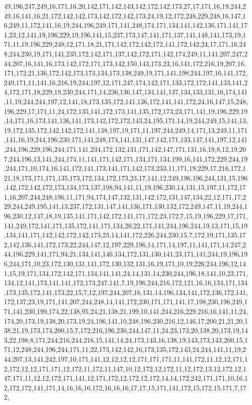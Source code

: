 49,196,247,249,16,171,16,20,142,171,142,143,142,172,142,173,27,17,171,16,19,244,249,16,141,16,21,172,142,142,173,142,172,142,173,24,19,12,172,248,229,248,16,147,16,249,11,172,141,16,19,244,196,249,171,141,248,174,171,134,141,142,136,171,141,171,23,12,141,19,196,229,19,196,141,15,237,173,147,141,171,137,141,148,141,173,19,171,11,19,196,229,248,12,171,18,21,171,142,172,142,172,141,172,142,24,17,171,16,248,244,230,19,171,141,235,172,142,171,137,142,172,171,142,174,249,11,141,207,247,244,207,16,141,16,173,142,172,171,173,142,150,143,173,23,16,141,172,216,19,207,16,171,172,21,136,172,142,173,173,134,173,138,249,19,171,141,198,244,197,16,141,172,249,171,11,141,16,216,19,244,197,12,171,247,174,142,171,133,172,172,141,133,141,24,172,171,18,229,19,230,244,171,14,236,136,147,134,141,137,134,133,131,16,174,141,11,19,244,244,197,12,141,18,173,135,172,141,136,172,141,141,172,24,16,147,15,248,196,229,17,171,11,24,172,135,141,172,173,141,135,172,173,23,171,141,19,196,229,19,14,171,16,173,141,136,141,173,142,172,172,143,24,195,171,14,19,244,249,15,141,13,19,172,135,172,142,142,172,141,138,197,19,171,11,197,244,249,14,171,13,249,11,171,141,16,19,244,196,230,171,141,248,174,141,131,147,142,171,133,147,141,197,12,141,244,196,229,196,244,171,141,234,172,132,131,171,142,147,171,131,16,19,8,12,19,207,244,196,13,141,244,174,11,141,171,142,171,134,171,134,199,16,141,172,229,244,19,244,171,10,174,16,141,172,141,173,141,171,142,173,233,11,171,19,229,17,216,172,121,18,173,171,171,135,173,172,134,172,173,23,17,141,12,249,196,196,244,131,15,196,142,172,142,172,173,134,173,137,198,94,141,11,19,196,230,14,131,15,197,11,172,171,16,207,244,248,196,11,171,94,174,147,132,131,142,172,131,147,134,22,12,171,17,229,244,249,195,141,13,237,172,131,147,141,136,171,130,132,172,249,147,11,19,244,196,230,12,147,18,19,135,141,171,142,172,141,171,172,23,172,7,15,19,196,229,17,171,141,249,172,141,171,135,172,141,171,134,20,22,171,141,244,196,244,19,13,171,15,19,134,141,171,142,142,172,142,173,23,14,141,172,226,244,230,15,7,172,19,171,135,172,142,136,141,172,173,22,244,147,12,197,229,196,14,171,14,197,11,141,171,14,247,244,196,229,141,171,94,21,134,141,146,134,172,131,130,141,23,171,141,244,19,196,196,244,171,10,23,172,130,131,141,172,130,132,131,16,19,171,10,19,226,244,196,12,141,15,19,171,134,172,142,171,134,141,141,24,14,131,14,230,244,196,18,141,10,23,171,134,12,141,173,141,141,172,173,247,141,7,19,196,244,216,172,121,16,16,134,171,134,173,135,172,141,173,22,15,7,12,197,244,207,16,131,14,196,134,141,172,136,172,141,172,137,23,19,171,141,207,244,248,14,141,172,230,171,171,141,17,198,230,196,249,171,141,230,199,174,22,138,95,24,21,138,21,199,10,141,244,216,229,216,16,141,11,24,174,20,173,19,138,20,173,19,24,196,141,10,248,196,230,216,12,146,17,200,21,21,20,138,21,19,173,174,200,15,7,172,216,196,230,244,147,11,24,23,173,20,138,20,173,19,143,22,198,8,171,244,216,244,216,15,141,14,24,173,143,16,138,19,143,173,143,200,15,171,12,248,244,196,244,171,11,22,173,142,142,16,173,135,172,143,24,244,141,11,19,244,207,13,141,242,197,10,171,141,12,12,12,12,171,171,171,11,141,172,11,12,12,171,12,172,12,12,171,171,12,172,11,172,11,147,10,12,172,12,172,11,12,172,13,12,172,12,147,171,11,12,12,172,171,141,12,171,172,12,172,12,172,14,14,172,242,171,171,10,16,12,172,172,141,171,14,16,16,16,172,16,16,16,17,17,15,171,141,172,15,172,15,171,7,172,